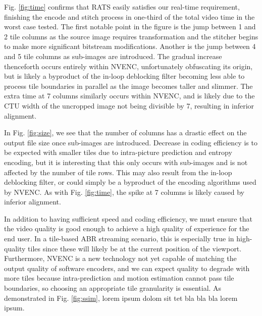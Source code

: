 Fig. \ref{fig:time} confirms that RATS easily satisfies our real-time requirement, finishing the encode and stitch process in one-third of the total video time in the worst case tested. The first notable point in the figure is the jump between 1 and 2 tile columns as the source image requires transformation and the stitcher begins to make more significant bitstream modifications. Another is the jump between 4 and 5 tile columns as sub-images are introduced. The gradual increase thenceforth occurs entirely within NVENC, unfortunately obfuscating its origin, but is likely a byproduct of the in-loop deblocking filter becoming less able to process tile boundaries in parallel as the image becomes taller and slimmer. The extra time at 7 columns similarly occurs within NVENC, and is likely due to the CTU width of the uncropped image not being divisible by 7, resulting in inferior alignment.

In Fig. \ref{fig:size}, we see that the number of columns has a drastic effect on the output file size once sub-images are introduced. Decrease in coding efficiency is to be expected with smaller tiles due to intra-picture prediction and entropy encoding, but it is interesting that this only occurs with sub-images and is not affected by the number of tile rows. This may also result from the in-loop deblocking filter, or could simply be a byproduct of the encoding algorithms used by NVENC. As with Fig. \ref{fig:time}, the spike at 7 columns is likely caused by inferior alignment.

In addition to having sufficient speed and coding efficiency, we must ensure that the video quality is good enough to achieve a high quality of experience for the end user. In a tile-based ABR streaming scenario, this is especially true in high-quality tiles since these will likely be at the current position of the viewport. Furthermore, NVENC is a new technology not yet capable of matching the output quality of software encoders, and we can expect quality to degrade with more tiles because intra-prediction and motion estimation cannot pass tile boundaries, so choosing an appropriate tile granularity is essential. As demonstrated in Fig. \ref{fig:ssim}, lorem ipsum dolom sit tet bla bla bla lorem ipsum.





